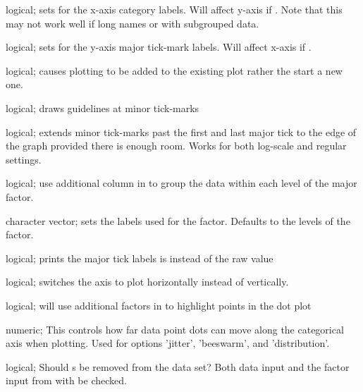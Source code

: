 \documentclass[a4paper]{book}
\begin{document}
\begin{Arguments}
\begin{ldescription}
\item[\code{rotateLabels}] logical; sets  for the x-axis category labels. Will affect y-axis if . Note that this may not work well if long names or with subgrouped data.

\item[\code{rotateY}] logical; sets  for the y-axis major tick-mark labels. Will affect x-axis if .

\item[\code{add}] logical; causes plotting to be added to the existing plot rather the start a new one.

\item[\code{minorGuides}] logical; draws guidelines at minor tick-marks

\item[\code{extendTicks}] logical; extends minor tick-marks past the first and last major tick to the edge of the graph provided there is enough room. Works for both log-scale and regular settings.

\item[\code{subGroup}] logical; use additional column in  to group the data within each level of the major factor.

\item[\code{subGroupLabels}] character vector; sets the labels used for the  factor. Defaults to the levels of the factor.

\item[\code{expLabels}] logical; prints the major tick labels is  instead of the raw value

\item[\code{sidePlot}] logical; switches the axis to plot horizontally instead of vertically.

\item[\code{pointHighlights}] logical; will use additional factors in  to highlight points in the dot plot

\item[\code{pointLaneWidth}] numeric; This controls how far data point dots can move along the categorical axis when plotting. Used for  options 'jitter', 'beeswarm', and 'distribution'.

\item[\code{na.rm}] logical; Should s be removed from the data set? Both data input and the factor input from  with be checked.


\end{ldescription}
\end{Arguments}
\end{document}

